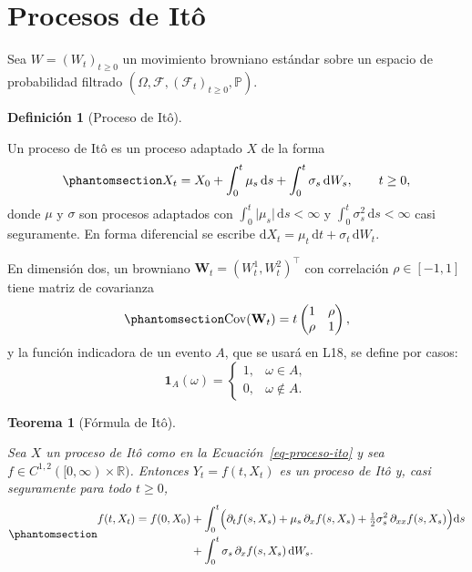 \documentclass[
  spanish,
  letterpaper,
  a4paper,
  11pt,
  oneside,
  numbers=noenddot]{scrbook}
\theoremstyle{definition}
\newtheorem{definition}{Definición}[chapter]
\theoremstyle{plain}
\theoremstyle{definition}
\theoremstyle{definition}
\theoremstyle{plain}
\newtheorem{theorem}{Teorema}[chapter]
\theoremstyle{remark}
\begin{document}
\section{Procesos de Itô}\label{sec-procesos-ito}

Sea \(W = (W_t)_{t \geq 0}\) un movimiento
browniano estándar
sobre un espacio de probabilidad filtrado
\((\Omega, \mathcal{F}, (\mathcal{F}_t)_{t \geq 0}, \mathbb{P})\).

\begin{definition}[Proceso de
Itô]\protect\hypertarget{def-proceso-ito}{}\label{def-proceso-ito}

Un proceso de Itô es un proceso
adaptado \(X\) de la forma
\begin{equation}\protect\phantomsection\label{eq-proceso-ito}{
X_t = X_0 + \int_0^t \mu_s \, \mathrm{d}s + \int_0^t \sigma_s \, \mathrm{d}W_s , \qquad t \geq 0,
}\end{equation} donde \(\mu\) y \(\sigma\) son procesos adaptados con
\(\int_0^t \lvert \mu_s \rvert \, \mathrm{d}s < \infty\) y
\(\int_0^t \sigma_s^{2} \, \mathrm{d}s < \infty\) casi seguramente. En
forma diferencial se escribe
\(\mathrm{d}X_t = \mu_t \, \mathrm{d}t + \sigma_t \, \mathrm{d}W_t\).

\end{definition}

En dimensión dos, un browniano
\(\mathbf{W}_t = (W^{1}_t, W^{2}_t)^{\top}\) con correlación
\(\rho \in [-1, 1]\) tiene matriz de covarianza
\begin{equation}\protect\phantomsection\label{eq-covarianza}{
\operatorname{Cov}(\mathbf{W}_t) = t \begin{pmatrix} 1 & \rho \\ \rho & 1 \end{pmatrix},
}\end{equation} y la función indicadora de un evento \(A\), que se usará
en L18, se define por casos: \[
\mathbf{1}_A(\omega) = \begin{cases} 1, & \omega \in A, \\ 0, & \omega \notin A. \end{cases}
\]

\begin{theorem}[Fórmula de
Itô]\protect\hypertarget{thm-ito}{}\label{thm-ito}

Sea \(X\) un proceso de Itô como en la Ecuación~\ref{eq-proceso-ito} y
sea \(f \in C^{1,2}([0, \infty) \times \mathbb{R})\). Entonces
\(Y_t = f(t, X_t)\) es un proceso de Itô y, casi seguramente para todo
\(t \geq 0\), \begin{equation}\protect\phantomsection\label{eq-ito}{
\begin{aligned}
f(t, X_t) = f(0, X_0)
  &+ \int_0^t \Bigl( \partial_t f(s, X_s) + \mu_s \, \partial_x f(s, X_s) + \tfrac{1}{2} \sigma_s^{2} \, \partial_{xx} f(s, X_s) \Bigr) \mathrm{d}s \\
  &+ \int_0^t \sigma_s \, \partial_x f(s, X_s) \, \mathrm{d}W_s .
\end{aligned}
}\end{equation}

\end{theorem}
\end{document}
